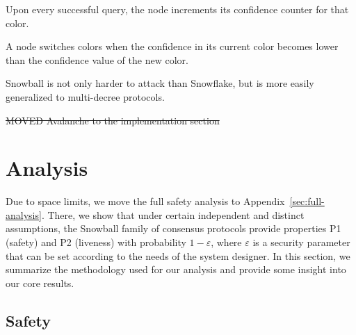 \documentclass[letterpaper,twocolumn,10pt]{article}
\newcommand{\editremove}[1]{{\color{red}\sout{#1}}}
\newcommand{\editchange}[1]{{\color{orange}#1}}
\theoremstyle{definition}
\begin{document}
\begin{compactenum}
    \item Upon every successful query, the node increments its confidence counter for that color.
    \item A node switches colors when the confidence in its current color becomes lower than the confidence value of the new color.
\end{compactenum}

Snowball is not only harder to attack than Snowflake, but is more easily
generalized to multi-decree protocols.

\editremove{MOVED Avalanche to the implementation section}
\section{Analysis}
\label{sec:analysis}
Due to space limits, we move the full safety analysis to Appendix~\ref{sec:full-analysis}.
There, we show that under certain independent and distinct assumptions, the \editchange{Snowball} family of consensus protocols provide properties P1 (safety) and P2 (liveness) with probability $1 - \varepsilon$, where $\varepsilon$ is a security parameter that can be set according to the needs of the system designer.
In this section, we summarize the methodology used for our analysis and provide some insight into our core results.
\subsection{Safety}
\end{document}
